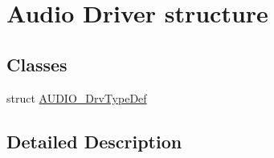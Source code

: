 \hypertarget{group___a_u_d_i_o___driver__structure}{}\section{Audio Driver structure}
\label{group___a_u_d_i_o___driver__structure}
\subsection*{Classes}
\begin{DoxyCompactItemize}
\item 
struct \mbox{\hyperlink{struct_a_u_d_i_o___drv_type_def}{A\+U\+D\+I\+O\+\_\+\+Drv\+Type\+Def}}
\end{DoxyCompactItemize}


\subsection{Detailed Description}
